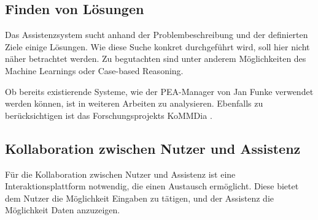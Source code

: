 \subsection{Finden von Lösungen}
Das Assistenzsystem sucht anhand der Problembeschreibung und der definierten Ziele einige Lösungen. Wie diese Suche konkret durchgeführt wird, soll hier nicht näher betrachtet werden. Zu begutachten sind unter anderem Möglichkeiten des Machine Learnings oder Case-based Reasoning.

Ob bereits existierende Systeme, wie der PEA-Manager von Jan Funke \cite{Funke2018} verwendet werden können, ist in weiteren Arbeiten zu analysieren. Ebenfalls zu berücksichtigen ist das Forschungsprojekts KoMMDia \cite{Rahm2018}.

\subsection{Kollaboration zwischen Nutzer und Assistenz}
\label{4:Kollaboration}
Für die Kollaboration zwischen Nutzer und Assistenz ist eine Interaktionsplattform notwendig, die einen Austausch ermöglicht. Diese bietet dem Nutzer die Möglichkeit Eingaben zu tätigen, und der Assistenz die Möglichkeit Daten anzuzeigen.

